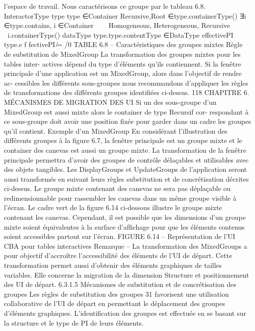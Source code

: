 \documentclass{article}
\begin{document}
l’espace de travail. Nous caractérisons ce groupe par le tableau 6.8.
InteractorType
type
type ∈{Container}
{Recursive,Root} ∈type.containerType()
∃i ∈type.contains, i ∈{Container}



Homogeneous,
Heterogeneous,
Recursive


⊆i.containerType()
dataType
type.type.contentType ∈DataType
effectivePI
type.e f fectivePI ̸= /0
TABLE 6.8 – Caractéristiques des groupes mixtes
Règle de substitution de MixedGroup
La transformation des groupes mixtes pour les tables inter-
actives dépend du type d’éléments qu’ils contiennent.
Si la fenêtre principale d’une application est un MixedGroup, alors dans l’objectif de rendre ac-
cessibles les différents sous-groupes nous recommandons d’appliquer les règles de transformations
des différents groupes identiﬁées ci-dessus.
118
CHAPITRE 6. MÉCANISMES DE MIGRATION DES UI
Si un des sous-groupe d’un MixedGroup est aussi mixte alors le container de type Recursif cor-
respondant à ce sous-groupe doit avoir une position ﬁxée pour garder dans un cadre les groupes qu’il
contient.
Exemple d’un MixedGroup
En considérant l’illustration des différents groupes à la ﬁgure 6.7, la
fenêtre principale est un groupe mixte et le container des canevas est aussi un groupe mixte.
La transformation de la fenêtre principale permettra d’avoir des groupes de contrôle délaçables
et utilisables avec des objets tangibles. Les DisplayGroups et UpdateGroups de l’application seront
aussi transformés en suivant leurs règles substitution et de concrétisation décrites ci-dessus. Le groupe
mixte contenant des canevas ne sera pas déplaçable ou redimensionnable pour rassembler les canevas
dans un même groupe visible à l’écran. Le cadre vert de la ﬁgure 6.14 ci-dessous illustre le groupe
mixte contenant les canevas. Cependant, il est possible que les dimensions d’un groupe mixte soient
équivalentes à la surface d’afﬁchage pour que les éléments contenus soient accessibles partout sur
l’écran.
FIGURE 6.14 – Représentation de l’UI CBA pour tables interactives
Remarque
– La transformation des MixedGroups a pour objectif d’accroître l’accessibilité des éléments de
l’UI de départ. Cette transformation permet aussi d’obtenir des éléments graphiques de tailles
variables. Elle concerne la migration de la dimension Structure et positionnement des UI de
départ.
6.3.1.5
Mécanismes de substitution et de concrétisation des groupes
Les règles de substitution des groupes 31 favorisent une utilisation collaborative de l’UI de départ
en permettant le déplacement des groupes d’éléments graphiques. L’identiﬁcation des groupes est
effectuée en se basant sur la structure et le type de PI de leurs éléments.
\end{document}
